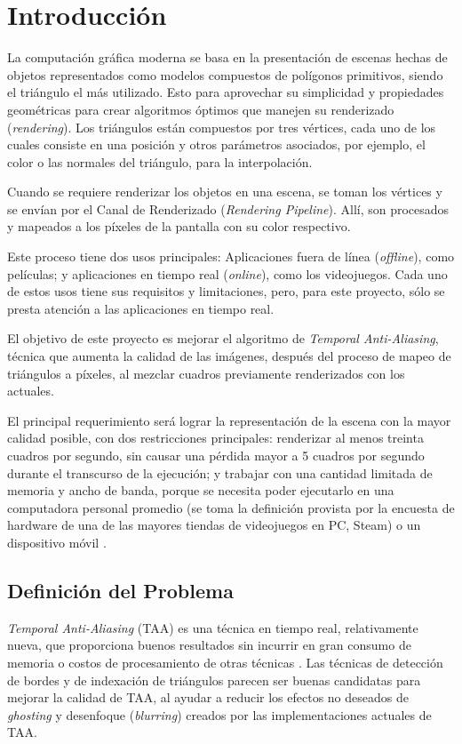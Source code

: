 \documentclass[pregrado]{tesis-usb} %
\begin{document}
\mainmatter

\chapter[Introducción]{Introducción}
La computación gráfica moderna se basa en la presentación de escenas hechas de objetos representados como modelos compuestos de polígonos primitivos, siendo el triángulo el más utilizado. Esto para aprovechar su simplicidad y propiedades geométricas para crear algoritmos óptimos que manejen su renderizado (\textit{rendering}). Los triángulos están compuestos por tres vértices, cada uno de los cuales consiste en una posición y otros parámetros asociados, por ejemplo, el color o las normales del triángulo, para la interpolación.

Cuando se requiere renderizar los objetos en una escena, se toman los vértices y se envían por el Canal de Renderizado (\textit{Rendering Pipeline}). Allí, son procesados y mapeados a los píxeles de la pantalla con su color respectivo.

Este proceso tiene dos usos principales: Aplicaciones fuera de línea (\textit{offline}), como películas; y aplicaciones en tiempo real (\textit{online}), como los videojuegos. Cada uno de estos usos tiene sus requisitos y limitaciones, pero, para este proyecto, sólo se presta atención a las aplicaciones en tiempo real.

El objetivo de este proyecto es mejorar el algoritmo de \textit{Temporal Anti-Aliasing}, técnica que aumenta la calidad de las imágenes, después del proceso de mapeo de triángulos a píxeles, al mezclar cuadros previamente renderizados con los actuales.

El principal requerimiento será lograr la representación de la escena con la mayor calidad posible, con dos restricciones principales: renderizar al menos treinta cuadros por segundo, sin causar una pérdida mayor a 5 cuadros por segundo durante el transcurso de la ejecución; y trabajar con una cantidad limitada de memoria y ancho de banda, porque se necesita poder ejecutarlo en una computadora personal promedio (se toma la definición provista por la encuesta de hardware de una de las mayores tiendas de videojuegos en PC, Steam) \cite{valvecorporation2018} o un dispositivo móvil \cite{Doggett2017EDAN35, Shreiner2011}. 


\section{Definición del Problema}
\textit{Temporal Anti-Aliasing} (TAA) es una técnica en tiempo real, relativamente nueva, que proporciona buenos resultados sin incurrir en gran consumo de memoria o costos de procesamiento de otras técnicas \cite{Doggett2017EDAN35}. Las técnicas de detección de bordes y de indexación de triángulos parecen ser buenas candidatas para mejorar la calidad de TAA, al ayudar a reducir los efectos no deseados de \textit{ghosting} y desenfoque (\textit{blurring}) creados por las implementaciones actuales de TAA.
\end{document}
